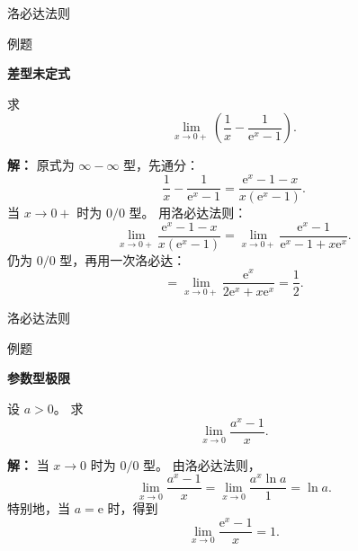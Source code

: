 \documentclass[aspectratio=169,10pt,fontset=fandol]{ctexbeamer}
\newcommand{\ee}{\mathrm{e}}
\begin{document}
\begin{frame}[t,fragile]{洛必达法则}
\small
\begin{block}{例题}
{\small
\textbf{差型未定式}\par

求
\[
\lim_{x\to0+}\left(\frac1x-\frac1{\ee^x-1}\right).
\]

}
\end{block}
\pause
{\small
\textbf{解：}
原式为 $\infty-\infty$ 型，先通分：
\[
\frac1x-\frac1{\ee^x-1}
=\frac{\ee^x-1-x}{x(\ee^x-1)}.
\]
当 $x\to0+$ 时为 $0/0$ 型。 用洛必达法则：
\[
\lim_{x\to0+}\frac{\ee^x-1-x}{x(\ee^x-1)}
=\lim_{x\to0+}\frac{\ee^x-1}{\ee^x-1+x\ee^x}.
\]
仍为 $0/0$ 型，再用一次洛必达：
\[
=\lim_{x\to0+}\frac{\ee^x}{2\ee^x+x\ee^x}
=\frac12.
\]

}
\end{frame}
\begin{frame}[t,fragile]{洛必达法则}
\normalsize
\begin{block}{例题}
{\normalsize
\textbf{参数型极限}\par

设 $a>0$。 求
\[
\lim_{x\to0}\frac{a^x-1}{x}.
\]

}
\end{block}
\pause
{\normalsize
\textbf{解：}
当 $x\to0$ 时为 $0/0$ 型。 由洛必达法则，
\[
\lim_{x\to0}\frac{a^x-1}{x}
=\lim_{x\to0}\frac{a^x\ln a}{1}
=\ln a.
\]
特别地，当 $a=\ee$ 时，得到
\[
\lim_{x\to0}\frac{\ee^x-1}{x}=1.
\]

}
\end{frame}
\end{document}
